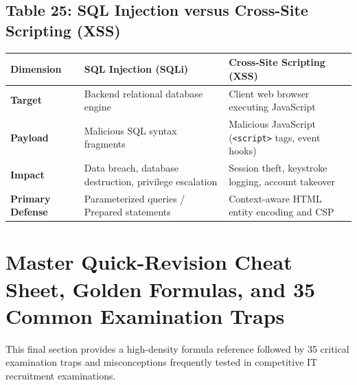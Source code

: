 \subsection*{Table 25: SQL Injection versus Cross-Site Scripting (XSS)}
\begin{center}
\small
\begin{tabularx}{\textwidth}{lXX}
\toprule
\textbf{Dimension} & \textbf{SQL Injection (SQLi)} & \textbf{Cross-Site Scripting (XSS)} \\
\midrule
\textbf{Target} & Backend relational database engine & Client web browser executing JavaScript \\
\textbf{Payload} & Malicious SQL syntax fragments & Malicious JavaScript (\lstinline|<script>| tags, event hooks) \\
\textbf{Impact} & Data breach, database destruction, privilege escalation & Session theft, keystroke logging, account takeover \\
\textbf{Primary Defense} & Parameterized queries / Prepared statements & Context-aware HTML entity encoding and CSP \\
\bottomrule
\end{tabularx}
\end{center}


\section{Master Quick-Revision Cheat Sheet, Golden Formulas, and 35 Common Examination Traps}
\label{sec:se_cheat_sheet_and_traps}

This final section provides a high-density formula reference followed by 35 critical examination traps and misconceptions frequently tested in competitive IT recruitment examinations.

